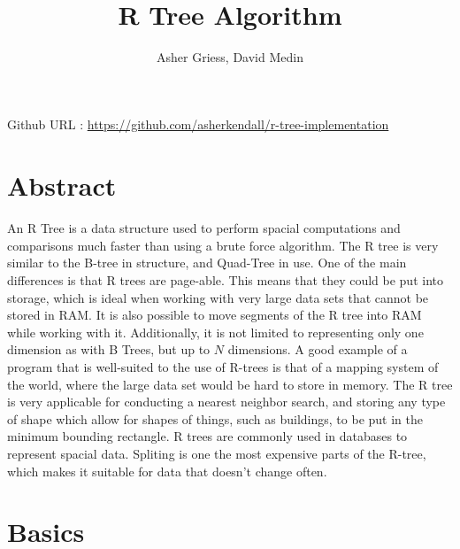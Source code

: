 \documentclass{article}
\author{Asher Griess, David Medin}
\title{R Tree Algorithm}
\begin{document}
\maketitle
\begin{center}
Github URL : \url{https://github.com/asherkendall/r-tree-implementation}
\end{center}

\begin{multicols}{2}[]
\section{Abstract}
\paragraph{}
An R Tree is a data structure used to perform spacial computations and comparisons much faster than using a brute force algorithm.
The R tree is very similar to the B-tree in structure, and Quad-Tree in use. One of the main differences is that
R trees are page-able. This means that they could be put into storage, which is ideal when working with very large data sets 
that cannot be stored in RAM. It is also possible to move segments of the R tree into RAM while working with it. Additionally, it is not limited to representing only one dimension as with B Trees, but up to $N$ dimensions. A good example
of a program that is well-suited to the use of R-trees is that of a mapping system of the world, where the large data set would be hard to store in memory.
The R tree is very applicable for conducting a nearest neighbor search, and storing any type of shape which allow for shapes
of things, such as buildings, to be put in the minimum bounding rectangle. R trees are commonly used in databases to represent spacial data.
Spliting is one the most expensive parts of the R-tree, which makes it suitable for data that doesn't change often.

\section{Basics}


\end{multicols}
\end{document}
